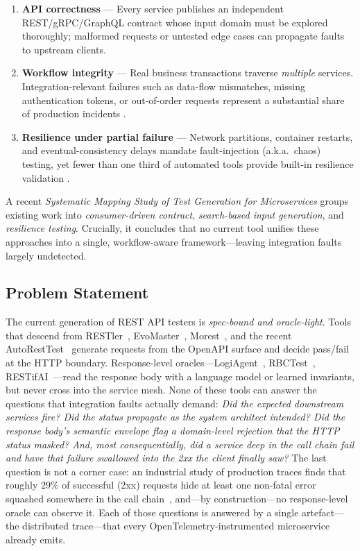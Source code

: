 \documentclass[conference]{IEEEtran}
\begin{document}
\begin{enumerate}[leftmargin=*,label=\roman*)]
  \item \textbf{API correctness} — Every service publishes an
        independent REST/gRPC/GraphQL contract whose input domain must be
        explored thoroughly; malformed requests or untested edge cases
        can propagate faults to upstream clients.
  \item \textbf{Workflow integrity} — Real business transactions
        traverse \emph{multiple} services.  
        Integration-relevant failures such as data-flow mismatches,
        missing authentication tokens, or out-of-order requests
        represent a substantial share of production incidents
        \cite{zhou2018microservice}.
  \item \textbf{Resilience under partial failure} — Network partitions,
        container restarts, and eventual-consistency delays mandate
        fault-injection (a.k.a.\ chaos) testing, yet fewer than one
        third of automated tools provide built-in resilience validation
        \cite{waseem2020testing}.
\end{enumerate}

A recent \emph{Systematic Mapping Study of Test Generation for
Microservices} \cite{miao2025sms} groups existing work into
\textit{consumer-driven contract}, \textit{search-based input
generation}, and \textit{resilience testing}.  Crucially, it concludes
that no current tool unifies these approaches into a single,
workflow-aware framework—leaving integration faults largely
undetected.

\subsection*{Problem Statement}
The current generation of REST API testers is \emph{spec-bound and
oracle-light}.  Tools that descend from RESTler~\cite{atlidakis2019restler}, EvoMaster~\cite{arcuri2019restful},
Morest~\cite{liu2022morest}, and the recent AutoRestTest~\cite{stennett2025autoresttest,kim2024multiagent}
generate requests from the OpenAPI surface and decide pass/fail at the
HTTP boundary.  Response-level oracles---LogiAgent~\cite{zhang2025logiagent},
RBCTest~\cite{rbctest2026}, RESTifAI~\cite{restifai2026}---read the
response body with a language model or learned invariants, but never
cross into the service mesh.  None of these tools can answer the
questions that integration faults actually demand: \emph{Did the expected
downstream services fire?  Did the status propagate as the system
architect intended?  Did the response body's semantic envelope flag a
domain-level rejection that the HTTP status masked?  And, most
consequentially, did a service deep in the call chain fail and have that
failure swallowed into the 2xx the client finally saw?}  The last
question is not a corner case: an industrial study of production traces
finds that roughly $29\%$ of successful (2xx) requests hide at least one
non-fatal error squashed somewhere in the call chain~\cite{uber2025tale},
and---by construction---no response-level oracle can observe it.  Each of those questions
is answered by a single artefact---the distributed trace---that every
OpenTelemetry-instrumented microservice already emits.
\end{document}
